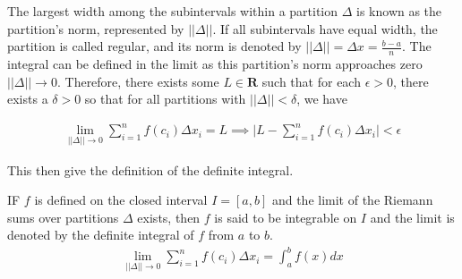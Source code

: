 The largest width among the subintervals within a partition $\Delta$ is known as the partition's norm, represented by $||\Delta||$. If all subintervals have equal width, the partition is called regular, and its norm is denoted by $||\Delta|| = \Delta x = \frac{b-a}{n}$. The integral can be defined in the limit as this partition's norm approaches zero $||\Delta|| \to 0$. Therefore, there exists some $L\in\mathbf{R}$ such that for each $\epsilon > 0$, there exists a $\delta > 0$ so that for all partitions with $||\Delta|| < \delta$, we have

\begin{align}
\lim_{||\Delta|| \to 0}\sum_{i=1}^{n}f(c_i)\Delta x_i = L \implies \bigg|L-\sum_{i=1}^{n}f(c_i)\Delta x_i\bigg| < \epsilon
\end{align}

This then give the definition of the definite integral.

\begin{defn}{1}
IF $f$ is defined on the closed interval $I=[a,b]$ and the limit of the Riemann sums over partitions $\Delta$ exists, then $f$ is said to be integrable on $I$ and the limit is denoted by the definite integral of $f$ from $a$ to $b$. 
\begin{align}
\lim_{||\Delta|| \to 0}\sum_{i=1}^{n}f(c_i)\Delta x_i = \int_a^b f(x)dx
\end{align}
\end{defn}

